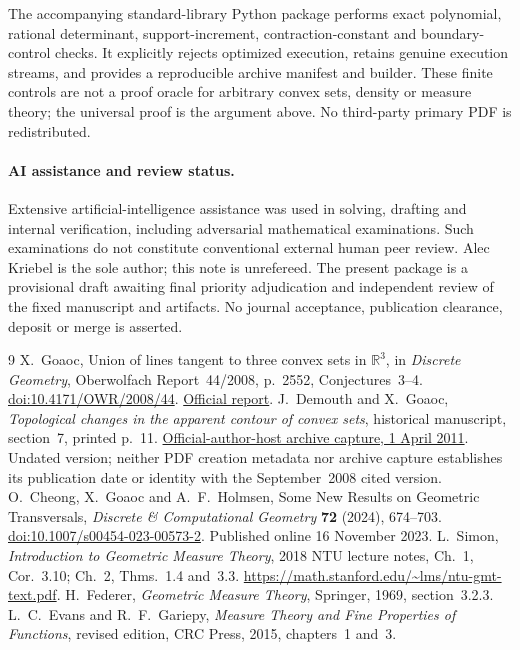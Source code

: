 \documentclass[11pt]{article}
\newcommand{\R}{\mathbb R}
\theoremstyle{remark}
\begin{document}
The accompanying standard-library Python package performs exact polynomial, rational determinant, support-increment, contraction-constant and boundary-control checks. It explicitly rejects optimized execution, retains genuine execution streams, and provides a reproducible archive manifest and builder. These finite controls are not a proof oracle for arbitrary convex sets, density or measure theory; the universal proof is the argument above. No third-party primary PDF is redistributed.

\paragraph{AI assistance and review status.}
Extensive artificial-intelligence assistance was used in solving, drafting and internal verification, including adversarial mathematical examinations. Such examinations do not constitute conventional external human peer review. Alec Kriebel is the sole author; this note is unrefereed. The present package is a provisional draft awaiting final priority adjudication and independent review of the fixed manuscript and artifacts. No journal acceptance, publication clearance, deposit or merge is asserted.

\begin{thebibliography}{9}
 X.~Goaoc, Union of lines tangent to three convex sets in $\R^3$, in \emph{Discrete Geometry}, Oberwolfach Report~44/2008, p.~2552, Conjectures~3--4. \href{https://doi.org/10.4171/OWR/2008/44}{doi:10.4171/OWR/2008/44}. \href{https://ems.press/content/serial-article-files/46191}{Official report}.
 J.~Demouth and X.~Goaoc, \emph{Topological changes in the apparent contour of convex sets}, historical manuscript, section~7, printed p.~11. \href{https://web.archive.org/web/20110401122240id_/http://www.loria.fr/~goaoc/papers/TopVE.pdf}{Official-author-host archive capture, 1 April 2011}. Undated version; neither PDF creation metadata nor archive capture establishes its publication date or identity with the September~2008 cited version.
 O.~Cheong, X.~Goaoc and A.~F.~Holmsen, Some New Results on Geometric Transversals, \emph{Discrete \& Computational Geometry} \textbf{72} (2024), 674--703. \href{https://doi.org/10.1007/s00454-023-00573-2}{doi:10.1007/s00454-023-00573-2}. Published online 16 November 2023.
 L.~Simon, \emph{Introduction to Geometric Measure Theory}, 2018 NTU lecture notes, Ch.~1, Cor.~3.10; Ch.~2, Thms.~1.4 and~3.3. \url{https://math.stanford.edu/~lms/ntu-gmt-text.pdf}.
 H.~Federer, \emph{Geometric Measure Theory}, Springer, 1969, section~3.2.3.
 L.~C.~Evans and R.~F.~Gariepy, \emph{Measure Theory and Fine Properties of Functions}, revised edition, CRC Press, 2015, chapters~1 and~3.
\end{thebibliography}
\end{document}
